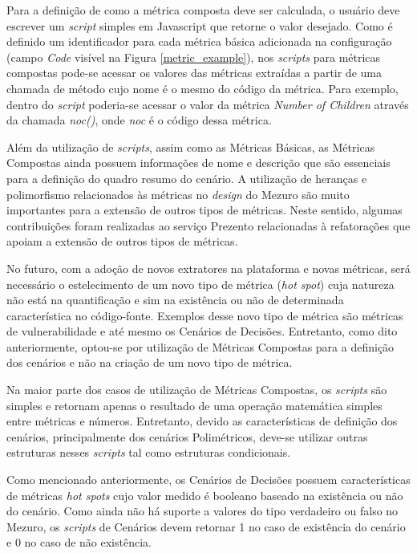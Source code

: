 Para a definição de como a métrica composta deve ser calculada, o usuário deve escrever um \emph{script} simples em Javascript que retorne o valor desejado. Como é definido um identificador para cada métrica básica adicionada na configuração (campo \emph{Code} visível na Figura \ref{metric_example}), nos \emph{scripts} para métricas compostas pode-se acessar os valores das métricas extraídas a partir de uma chamada de método cujo nome é o mesmo do código da métrica. Para exemplo, dentro do \emph{script} poderia-se acessar o valor da métrica \emph{Number of Children} através da chamada \emph{noc()}, onde \emph{noc} é o código dessa métrica.

Além da utilização de \emph{scripts}, assim como as Métricas Básicas, as Métricas Compostas ainda possuem informações de nome e descrição que são essenciais para a definição do quadro resumo do cenário. A utilização de heranças e polimorfismo relacionados às métricas no \emph{design} do Mezuro são muito importantes para a extensão de outros tipos de métricas. Neste sentido, algumas contribuições foram realizadas ao serviço Prezento relacionadas à refatorações que apoiam a extensão de outros tipos de métricas. 

No futuro, com a adoção de novos extratores na plataforma e novas métricas, será necessário o estelecimento de um novo tipo de métrica (\emph{hot spot}) cuja natureza não está na quantificação e sim na existência ou não de determinada característica no código-fonte. Exemplos desse novo tipo de métrica são métricas de vulnerabilidade e até mesmo os Cenários de Decisões. Entretanto, como dito anteriormente, optou-se por utilização de Métricas Compostas para a definição dos cenários e não na criação de um novo tipo de métrica.

Na maior parte dos casos de utilização de Métricas Compostas, os \emph{scripts} são simples e retornam apenas o resultado de uma operação matemática simples entre métricas e números. Entretanto, devido as características de definição dos cenários, principalmente dos cenários Polimétricos, deve-se utilizar outras estruturas nesses \emph{scripts} tal como estruturas condicionais.

Como mencionado anteriormente, os Cenários de Decisões possuem características de métricas \emph{hot spots} cujo valor medido é booleano baseado na existência ou não do cenário. Como ainda não há suporte a valores do tipo verdadeiro ou falso no Mezuro, os \emph{scripts} de Cenários devem retornar 1 no caso de existência do cenário e 0 no caso de não existência.

